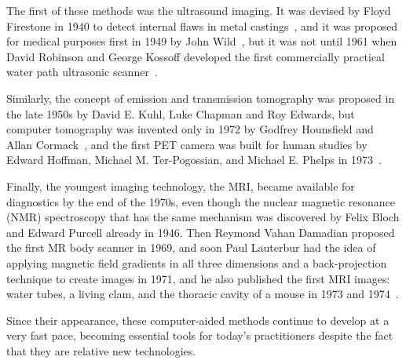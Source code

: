 The first of these methods was the ultrasound imaging. It was devised by Floyd Firestone in 1940 to detect internal flaws in metal castings~\cite{singh_origin_2007}, and it was proposed for medical purposes first in 1949 by John Wild~\cite{watts_john_2009}, but it was not until 1961 when David Robinson and George Kossoff developed the first commercially practical water path ultrasonic scanner~\cite{griffiths_historical_nodate}.

Similarly, the concept of emission and transmission tomography was proposed in the late 1950s by David E. Kuhl, Luke Chapman and Roy Edwards, but computer tomography was invented only in 1972 by Godfrey Hounsfield and Allan Cormack~\cite{richmond_sir_2004}, and the first PET camera was built for human studies by Edward Hoffman, Michael M. Ter-Pogossian, and Michael E. Phelps in 1973~\cite{noauthor_us_nodate}.

Finally, the youngest imaging technology, the MRI, became available for diagnostics by the end of the 1970s, even though the nuclear magnetic resonance (NMR) spectroscopy that has the same mechanism was discovered by Felix Bloch and Edward Purcell already in 1946. Then Reymond Vahan Damadian proposed the first MR body scanner in 1969, and soon Paul Lauterbur had the idea of applying magnetic field gradients in all three dimensions and a back-projection technique to create images in 1971, and he also published the first MRI images: water tubes, a living clam, and the thoracic cavity of a mouse in 1973 and 1974~\cite{rinck_short_2008}.

Since their appearance, these computer-aided methods continue to develop at a very fast pace, becoming essential tools for today's practitioners despite the fact that they are relative new technologies.

